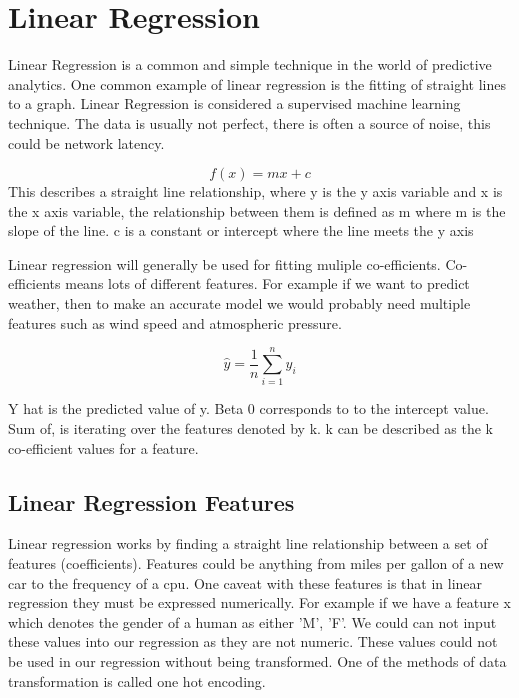 \section{Linear Regression}

Linear Regression is a common and simple technique in the world of predictive analytics. One common example of linear regression is the fitting of straight lines to a graph. Linear Regression is considered a supervised machine learning technique. The data is usually not perfect, there is often a source of noise, this could be network latency.

\begin{equation}
    f(x) = mx+c
\end{equation}
This describes a straight line relationship, where y is the y axis variable and x is the x axis variable, the relationship between them is defined as m where m is the slope of the line. c is a constant or intercept where the line meets the y axis

Linear regression will generally be used for fitting muliple co-efficients. Co-efficients means lots of different features. For example if we want to predict weather, then to make an accurate model we would probably need multiple features such as wind speed and atmospheric pressure.

\begin{equation}
\hat{y} = \frac{1}{n}\sum_{i=1}^n y_i
\end{equation}

Y hat is the predicted value of y. Beta 0 corresponds to to the intercept value. Sum of, is iterating over the features denoted by k. k can be described as the k co-efficient values for a feature.

\subsection{Linear Regression Features}

Linear regression works by finding a straight line relationship between a set of features (coefficients). Features could be anything from miles per gallon of a new car to the frequency of a cpu. One caveat with these features is that in linear regression they must be expressed numerically. For example if we have a feature x which denotes the gender of a human as either 'M', 'F'. We could can not input these values into our regression as they are not numeric. These values could not be used in our regression without being transformed. One of the methods of data transformation is called one hot encoding. 

